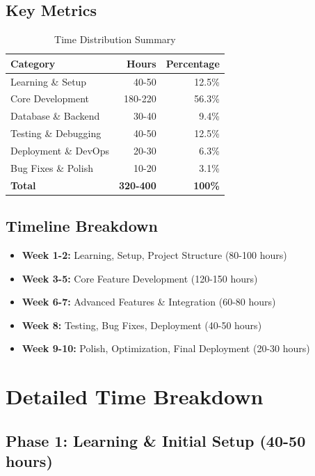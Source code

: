 \documentclass[11pt,a4paper]{article}
\begin{document}
\subsection{Key Metrics}
\begin{table}[h]
\centering
\begin{tabular}{lrr}
\toprule
\textbf{Category} & \textbf{Hours} & \textbf{Percentage} \\
\midrule
Learning \& Setup & 40-50 & 12.5\% \\
Core Development & 180-220 & 56.3\% \\
Database \& Backend & 30-40 & 9.4\% \\
Testing \& Debugging & 40-50 & 12.5\% \\
Deployment \& DevOps & 20-30 & 6.3\% \\
Bug Fixes \& Polish & 10-20 & 3.1\% \\
\bottomrule
\textbf{Total} & \textbf{320-400} & \textbf{100\%} \\
\bottomrule
\end{tabular}
\caption{Time Distribution Summary}
\end{table}

\subsection{Timeline Breakdown}
\begin{itemize}
    \item \textbf{Week 1-2:} Learning, Setup, Project Structure (80-100 hours)
    \item \textbf{Week 3-5:} Core Feature Development (120-150 hours)
    \item \textbf{Week 6-7:} Advanced Features \& Integration (60-80 hours)
    \item \textbf{Week 8:} Testing, Bug Fixes, Deployment (40-50 hours)
    \item \textbf{Week 9-10:} Polish, Optimization, Final Deployment (20-30 hours)
\end{itemize}

\newpage

\section{Detailed Time Breakdown}

\subsection{Phase 1: Learning \& Initial Setup (40-50 hours)}
\end{document}
